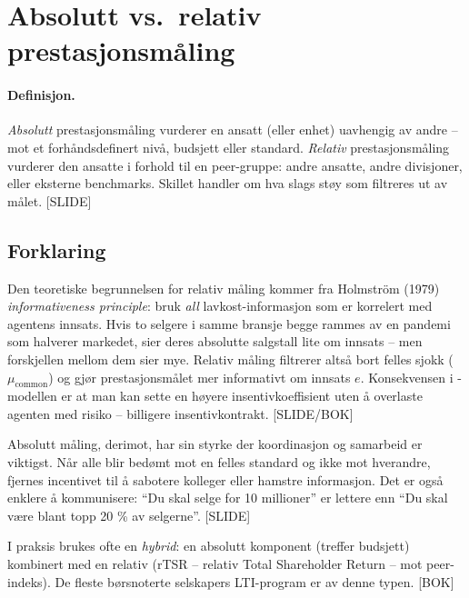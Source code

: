 \section{Absolutt vs.\ relativ prestasjonsmåling}\label{thr:absolute-vs-relative-performance}

\paragraph{Definisjon.} \emph{Absolutt} prestasjonsmåling vurderer en ansatt (eller enhet) uavhengig av andre -- mot et forhåndsdefinert nivå, budsjett eller standard. \emph{Relativ} prestasjonsmåling vurderer den ansatte i forhold til en peer-gruppe: andre ansatte, andre divisjoner, eller eksterne benchmarks. Skillet handler om hva slags støy som filtreres ut av målet. [SLIDE]

\subsection*{Forklaring}

Den teoretiske begrunnelsen for relativ måling kommer fra Holmström (1979) \emph{informativeness principle}: bruk \emph{all} lavkost-informasjon som er korrelert med agentens innsats. Hvis to selgere i samme bransje begge rammes av en pandemi som halverer markedet, sier deres absolutte salgstall lite om innsats -- men forskjellen mellom dem sier mye. Relativ måling filtrerer altså bort felles sjokk ($\mu_{\text{common}}$) og gjør prestasjonsmålet mer informativt om innsats $e$. Konsekvensen i -modellen er at man kan sette en høyere insentivkoeffisient  uten å overlaste agenten med risiko -- billigere insentivkontrakt. [SLIDE/BOK]

Absolutt måling, derimot, har sin styrke der koordinasjon og samarbeid er viktigst. Når alle blir bedømt mot en felles standard og ikke mot hverandre, fjernes incentivet til å sabotere kolleger eller hamstre informasjon. Det er også enklere å kommunisere: ``Du skal selge for 10 millioner'' er lettere enn ``Du skal være blant topp 20 \% av selgerne''. [SLIDE]

I praksis brukes ofte en \emph{hybrid}: en absolutt komponent (treffer budsjett) kombinert med en relativ (rTSR -- relativ Total Shareholder Return -- mot peer-indeks). De fleste børsnoterte selskapers LTI-program er av denne typen. [BOK]

